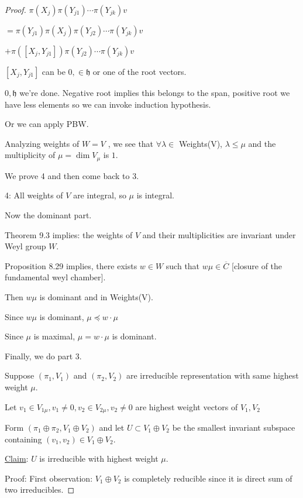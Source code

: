 \documentclass{article}
\theoremstyle{definition}
\begin{document}
\begin{proof}
    \(\pi (X_j)\pi(Y_{j1})\cdots \pi(Y_{jk})v\)
    
    \(= \pi(Y_{j1})\pi(X_j)\pi(Y_{j2})\cdots \pi(Y_{jk})v\)
    
    \(+ \pi([X_j,Y_{j1}])\pi(Y_{j2})\cdots \pi(Y_{jk})v\) 

    \([X_j, Y_{j1}]\) can be \(0, \in \mathfrak{h} \) or one of the root vectors.

    \(0, \mathfrak{h}\) we're done. Negative root implies this belongs to the span, positive root we have less elements so we can invoke induction hypothesis.

    Or we can apply PBW.

    Analyzing weights of \(W = V\) , we see that \(\forall \lambda \in\) Weights(V), \(\lambda \leq \mu \) and the multiplicity of \(\mu = \dim V_{\mu} \) is \(1\).

    We prove 4 and then come back to 3.

    4: All weights of \(V\) are integral, so \(\mu\) is integral.

    Now the dominant part.

    Theorem 9.3 implies: the weights of \(V\) and their multiplicities are invariant under Weyl group \(W\).

    Proposition 8.29 implies, there exists \(w\in W\) such that \(w \mu \in \overline{C}\) [closure of the fundamental weyl chamber].

    Then \(w \mu\) is dominant and in Weights(V).

    Since \(w \mu\) is dominant, \(\mu \preceq w\cdot \mu \) 

    Since \(\mu\) is maximal, \(\mu = w\cdot \mu\) is dominant.

    Finally, we do part 3.

    Suppose \((\pi_1, V_1)\) and \((\pi_2, V_2)\) are irreducible representation with same highest weight \(\mu \).
    
    Let \(v_1\in V_{1 \mu}, v_1\neq 0, v_2\in V_{2\mu}, v_2\neq 0\) are highest weight vectors of \(V_1, V_2\) 
    
    Form \((\pi_1 \oplus \pi_2, V_1 \oplus V_2)\) and let \(U \subset V_1 \oplus V_2\) be the smallest invariant subspace containing \((v_1,v_2)\in V_1 \oplus V_2\).

    \underline{Claim}: \(U\) is irreducible with highest weight \(\mu\).

    Proof: First observation: \(V_1 \oplus V_2\) is completely reducible since it is direct sum of two irreducibles.


\end{proof}
\end{document}
